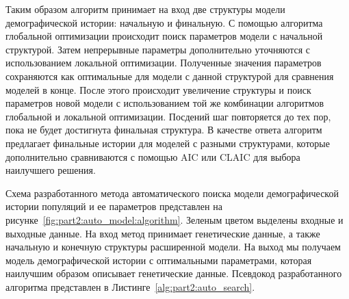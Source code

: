 Таким образом алгоритм принимает на вход две структуры модели демографической истории: начальную и финальную.
С помощью алгоритма глобальной оптимизации происходит поиск параметров модели с начальной структурой.
Затем непрерывные параметры дополнительно уточняются с использованием локальной оптимизации.
Полученные значения параметров сохраняются как оптимальные для модели с данной структурой для сравнения моделей в конце.
После этого происходит увеличение структуры и поиск параметров новой модели с использованием той же комбинации алгоритмов глобальной и локальной оптимизации.
Посдений шаг повторяется до тех пор, пока не будет достигнута финальная структура.
В качестве ответа алгоритм предлагает финальные истории для моделей с разными структурами, которые дополнительно сравниваются с помощью AIC или CLAIC для выбора наилучшего решения.

Схема разработанного метода автоматического поиска модели демографической истории популяций и ее параметров представлен на рисунке~\ref{fig:part2:auto_model:algorithm}.
Зеленым цветом выделены входные и выходные данные.
На вход метод принимает генетические данные, а также начальную и конечную структуры расширенной модели.
На выход мы получаем модель демографической истории с оптимальными параметрами, которая наилучшим образом описывает генетические данные.
Псевдокод разработанного алгоритма представлен в Листинге~\ref{alg:part2:auto_search}.